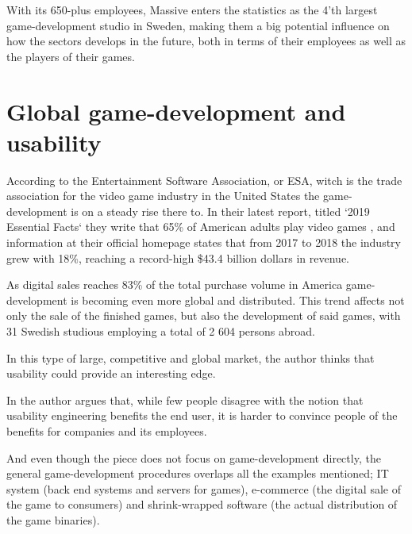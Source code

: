   With its 650-plus employees, Massive enters the statistics as the 4'th
  largest game-development studio in Sweden\cite[p. 21]{citeIndex2019},
  making them a big potential influence on how the sectors develops in the
  future, both in terms of their employees as well as the players of their
  games.


\section{Global game-development and usability}


  According to the Entertainment Software Association, or ESA, witch is the trade
  association for the video game industry in the United States the game-development
  is on a steady rise there to. In their latest report, titled `2019 Essential Facts`%
  \cite{cite2019EssentialFactsAbouttheComputerandVideoGameIndustryEntertainmentSoftwareAssociation}
  they write that 65\% of American adults play video
  games\cite[p. 4]{cite2019EssentialFactsAbouttheComputerandVideoGameIndustryEntertainmentSoftwareAssociation}
  , and information at their official homepage states that from 2017 to 2018
  the industry grew with 18\%, reaching a record-high \$43.4 billion dollars in
  revenue\cite{eseaEconomicGrowth}.

  As digital sales reaches 83\% of the total purchase volume in America%
  \cite[p. 20]{cite2019EssentialFactsAbouttheComputerandVideoGameIndustryEntertainmentSoftwareAssociation}
  game-development is becoming even more global and distributed. This trend affects
  not only the sale of the finished games, but also the development of said
  games, with 31 Swedish studious employing a total of 2 604 persons
  abroad\cite[p. 27]{citeIndex2019}.

  In this type of large, competitive and global market, the author thinks that
  usability could provide an interesting edge.

  In \cite{citeBottomLine} the author
  \citeauthor{citeBottomLine} argues that, while few people disagree with
  the notion that usability engineering benefits the end user, it is harder to
  convince people of the benefits for companies and its employees.

  And even though the piece does not focus on game-development directly, the
  general game-development procedures overlaps all the examples
  mentioned; IT system (back end systems and servers for games), e-commerce (the
  digital sale of the game to consumers) and shrink-wrapped software (the actual
  distribution of the game binaries).

